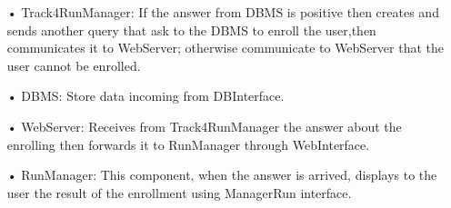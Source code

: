 \begin{enumerate}
\begin{enumerate}
\begin{enumerate}
		\item[•] Track4RunManager: If the answer from DBMS is positive then creates and sends another query that ask to the DBMS to enroll the user,then communicates it to WebServer; otherwise communicate to WebServer that the user cannot be enrolled.
		\item[•] DBMS: Store data incoming from DBInterface.
		\item[•] WebServer: Receives from Track4RunManager the answer about the enrolling then forwards it to RunManager through WebInterface.
		\item[•] RunManager: This component, when the answer is arrived, displays to the user the result of the enrollment using ManagerRun interface.
		\end{enumerate}	
	\end{enumerate}
	

\end{enumerate}
